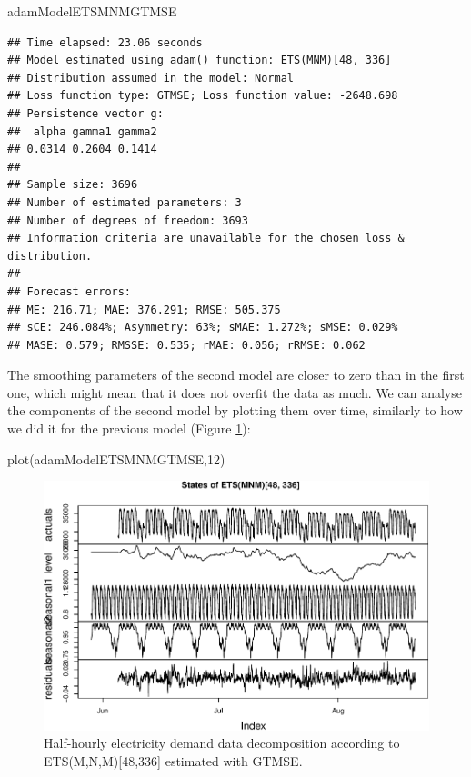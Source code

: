 \documentclass[
]{book}
\newenvironment{Shaded}{\begin{snugshade}}{\end{snugshade}}
\newcommand{\DecValTok}[1]{\textcolor[rgb]{0.00,0.00,0.81}{#1}}
\newcommand{\FunctionTok}[1]{\textcolor[rgb]{0.00,0.00,0.00}{#1}}
\newcommand{\NormalTok}[1]{#1}
\theoremstyle{definition}
\theoremstyle{definition}
\theoremstyle{definition}
\theoremstyle{definition}
\theoremstyle{remark}
\begin{document}
\begin{Shaded}
\begin{Highlighting}[]
\NormalTok{adamModelETSMNMGTMSE}
\end{Highlighting}
\end{Shaded}

\begin{verbatim}
## Time elapsed: 23.06 seconds
## Model estimated using adam() function: ETS(MNM)[48, 336]
## Distribution assumed in the model: Normal
## Loss function type: GTMSE; Loss function value: -2648.698
## Persistence vector g:
##  alpha gamma1 gamma2 
## 0.0314 0.2604 0.1414 
## 
## Sample size: 3696
## Number of estimated parameters: 3
## Number of degrees of freedom: 3693
## Information criteria are unavailable for the chosen loss & distribution.
## 
## Forecast errors:
## ME: 216.71; MAE: 376.291; RMSE: 505.375
## sCE: 246.084%; Asymmetry: 63%; sMAE: 1.272%; sMSE: 0.029%
## MASE: 0.579; RMSSE: 0.535; rMAE: 0.056; rRMSE: 0.062
\end{verbatim}

The smoothing parameters of the second model are closer to zero than in the first one, which might mean that it does not overfit the data as much. We can analyse the components of the second model by plotting them over time, similarly to how we did it for the previous model (Figure \ref{fig:adamModelETSMNMGTMSE12}):

\begin{Shaded}
\begin{Highlighting}[]
\FunctionTok{plot}\NormalTok{(adamModelETSMNMGTMSE,}\DecValTok{12}\NormalTok{)}
\end{Highlighting}
\end{Shaded}

\begin{figure}
\centering
\includegraphics{Svetunkov--2022----ADAM_files/figure-latex/adamModelETSMNMGTMSE12-1.pdf}
\caption{\label{fig:adamModelETSMNMGTMSE12}Half-hourly electricity demand data decomposition according to ETS(M,N,M){[}48,336{]} estimated with GTMSE.}
\end{figure}
\end{document}
